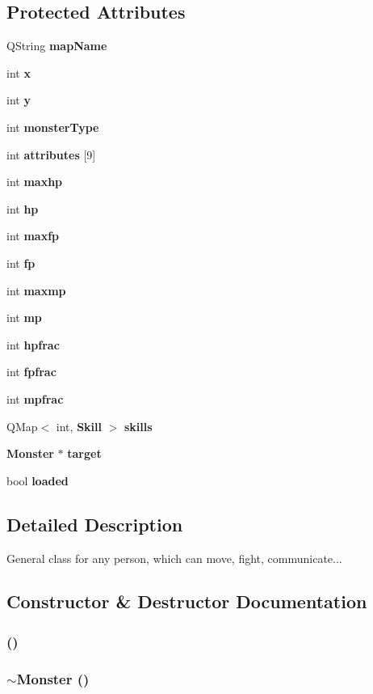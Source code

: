 \subsection*{Protected Attributes}
\begin{CompactItemize}
\item 
QString {\bf map\-Name}
\item 
int {\bf x}
\item 
int {\bf y}
\item 
int {\bf monster\-Type}
\item 
int {\bf attributes} [9]
\item 
int {\bf maxhp}
\item 
int {\bf hp}
\item 
int {\bf maxfp}
\item 
int {\bf fp}
\item 
int {\bf maxmp}
\item 
int {\bf mp}
\item 
int {\bf hpfrac}
\item 
int {\bf fpfrac}
\item 
int {\bf mpfrac}
\item 
QMap$<$ int, {\bf Skill} $>$ {\bf skills}
\item 
{\bf Monster} $\ast$ {\bf target}
\item 
bool {\bf loaded}
\end{CompactItemize}


\subsection{Detailed Description}
General class for any person, which can move, fight, communicate... 



\subsection{Constructor \& Destructor Documentation}
\subsubsection{ ()}\label{classMonster_a0}


\subsubsection{\setlength{\rightskip}{0pt plus 5cm}$\sim${\bf Monster} ()\hspace{0.3cm}{\tt  [virtual]}}\label{classMonster_a1}




